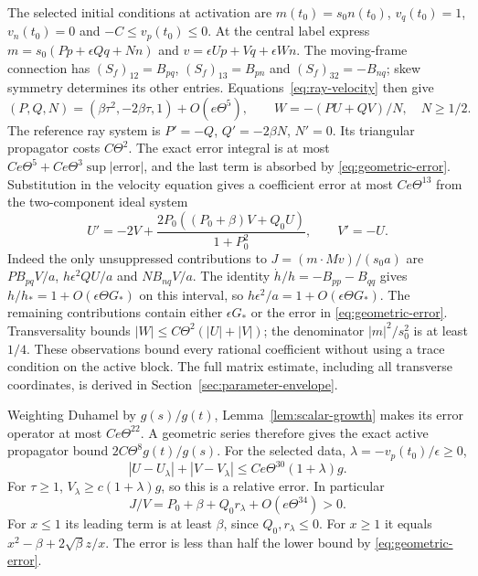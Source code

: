 The selected initial conditions at activation are
$m(t_0)=s_0n(t_0)$, $v_q(t_0)=1$, $v_n(t_0)=0$ and
$-C\leq v_p(t_0)\leq0$. At the central label express
$m=s_0(Pp+\epsilon Qq+Nn)$ and
$v=\epsilon Up+Vq+\epsilon Wn$. The moving-frame connection has
$(S_f)_{12}=B_{pq}$, $(S_f)_{13}=B_{pn}$ and
$(S_f)_{32}=-B_{nq}$; skew symmetry determines its other entries.
Equations~\eqref{eq:ray-velocity} then give
\[
 (P,Q,N)=(\beta\tau^2,-2\beta\tau,1)+O(e\Theta^5),
 \qquad W=-(PU+QV)/N,\quad N\geq1/2.
\]
The reference ray system is $P'=-Q$, $Q'=-2\beta N$, $N'=0$.
Its triangular propagator costs $C\Theta^2$. The exact error integral
is at most $Ce\Theta^5+Ce\Theta^3\sup|\mathrm{error}|$, and the last
term is absorbed by \eqref{eq:geometric-error}. Substitution in the
velocity equation gives a coefficient error at most $Ce\Theta^{13}$
from the two-component ideal system
\[
 U'=-2V+\frac{2P_0((P_0+\beta)V+Q_0U)}{1+P_0^2},\qquad V'=-U.
\]
Indeed the only unsuppressed contributions to
$J=(m\cdot Mv)/(s_0a)$ are $PB_{pq}V/a$, $h\epsilon^2QU/a$
and $NB_{nq}V/a$. The identity $\dot h/h=-B_{pp}-B_{qq}$ gives
$h/h_*=1+O(\epsilon\Theta G_*)$ on this interval, so
$h\epsilon^2/a=1+O(\epsilon\Theta G_*)$. The remaining contributions
contain either $\epsilon G_*$ or the error in
\eqref{eq:geometric-error}. Transversality bounds
$|W|\leq C\Theta^2(|U|+|V|)$; the denominator $|m|^2/s_0^2$
is at least $1/4$. These observations bound every rational coefficient
without using a trace condition on the active block.
The full matrix estimate, including all transverse coordinates, is
derived in Section~\ref{sec:parameter-envelope}.

Weighting Duhamel by $g(s)/g(t)$, Lemma~\ref{lem:scalar-growth} makes
its error operator at most $Ce\Theta^{22}$. A geometric series therefore
gives the exact active propagator bound $2C\Theta^8g(t)/g(s)$.
For the selected data, $\lambda=-v_p(t_0)/\epsilon\geq0$,
\[
 |U-U_\lambda|+|V-V_\lambda|
       \leq Ce\Theta^{30}(1+\lambda)g.
\]
For $\tau\geq1$, $V_\lambda\geq c(1+\lambda)g$, so this is a
relative error. In particular
\begin{equation}\label{eq:positive-flux}
 J/V=P_0+\beta+Q_0r_\lambda+O(e\Theta^{34})>0.
\end{equation}
For $x\leq1$ its leading term is at least $\beta$, since
$Q_0,r_\lambda\leq0$. For $x\geq1$ it equals
$x^2-\beta+2\sqrt\beta z/x$. The error is less than half the
lower bound by \eqref{eq:geometric-error}.

